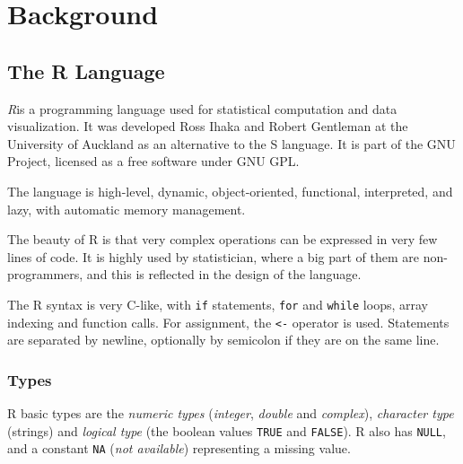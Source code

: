 \chapter{Background}

\begin{chapterabstract}
	\todoadd
\end{chapterabstract}

\section{The R Language}

\textit{R}\todocite is a programming language used for statistical computation and data visualization. It was developed Ross Ihaka and Robert Gentleman at the University of Auckland as an alternative to the S language\todocite. It is part of the GNU Project, licensed as a free software under GNU GPL.

The language is high-level, dynamic, object-oriented, functional, interpreted, and lazy, with automatic memory management.

The beauty of R is that very complex operations can be expressed in very few lines of code.  It is highly used by statistician, where a big part of them are non-programmers, and this is reflected in the design of the language.

The R syntax is very C-like, with \texttt{if} statements, \texttt{for} and \texttt{while} loops, array indexing and function calls. For assignment, the \texttt{<-} operator is used. Statements are separated by newline, optionally by semicolon if they are on the same line.

\subsection*{Types}

R basic types are the \textit{numeric types} (\textit{integer}, \textit{double} and \textit{complex}), \textit{character type} (strings) and \textit{logical type} (the boolean values \texttt{TRUE} and \texttt{FALSE}). R also has \texttt{NULL}, and a constant \texttt{NA} (\textit{not available}) representing a missing value.

